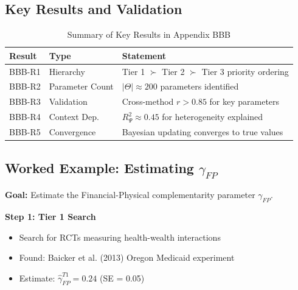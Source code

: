 \subsection{Key Results and Validation}
\label{sec:BBB-results}

\begin{table}[htbp]
\centering
\caption{Summary of Key Results in Appendix BBB}
\label{tab:bbb-results}
\renewcommand{\arraystretch}{1.2}
\begin{tabular}{@{}llp{6cm}@{}}
\toprule
\textbf{Result} & \textbf{Type} & \textbf{Statement} \\
\midrule
BBB-R1 & Hierarchy & Tier 1 $\succ$ Tier 2 $\succ$ Tier 3 priority ordering \\
BBB-R2 & Parameter Count & $|\Theta| \approx 200$ parameters identified \\
BBB-R3 & Validation & Cross-method $r > 0.85$ for key parameters \\
BBB-R4 & Context Dep. & $R^2_\Psi \approx 0.45$ for heterogeneity explained \\
BBB-R5 & Convergence & Bayesian updating converges to true values \\
\bottomrule
\end{tabular}
\end{table}


\subsection{Worked Example: Estimating $\gamma_{FP}$}
\label{sec:BBB-example}

\textbf{Goal:} Estimate the Financial-Physical complementarity parameter $\gamma_{FP}$.

\textbf{Step 1: Tier 1 Search}
\begin{itemize}[nosep]
    \item Search for RCTs measuring health-wealth interactions
    \item Found: Baicker et al. (2013) Oregon Medicaid experiment
    \item Estimate: $\hat{\gamma}_{FP}^{T1} = 0.24$ (SE = 0.05)
\end{itemize}

